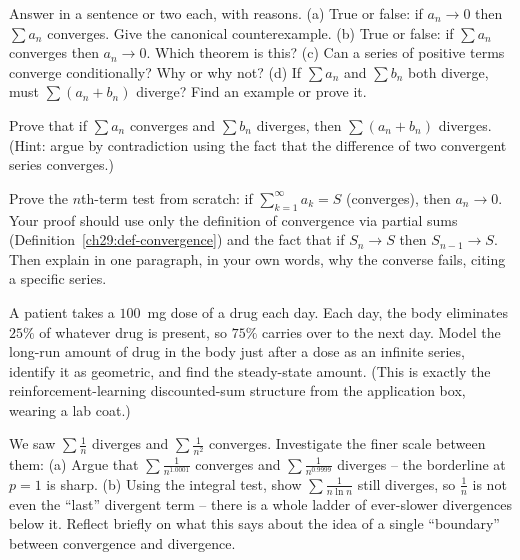 \begin{exercise}[Conceptual]
Answer in a sentence or two each, with reasons.
(a) True or false: if $a_n \to 0$ then $\sum a_n$ converges. Give the canonical counterexample.
(b) True or false: if $\sum a_n$ converges then $a_n \to 0$. Which theorem is this?
(c) Can a series of positive terms converge conditionally? Why or why not?
(d) If $\sum a_n$ and $\sum b_n$ both diverge, must $\sum(a_n+b_n)$ diverge? Find an example or prove it.
\end{exercise}

\begin{exercise}[Prove it]
Prove that if $\sum a_n$ converges and $\sum b_n$ diverges, then $\sum (a_n + b_n)$ diverges. (Hint: argue by contradiction using the fact that the difference of two convergent series converges.)
\end{exercise}

\begin{exercise}
Prove the $n$th-term test from scratch: if $\sum_{k=1}^\infty a_k = S$ (converges), then $a_n \to 0$. Your proof should use only the definition of convergence via partial sums (Definition~\ref{ch29:def-convergence}) and the fact that if $S_n \to S$ then $S_{n-1}\to S$. Then explain in one paragraph, in your own words, why the converse fails, citing a specific series.
\end{exercise}

\begin{exercise}
A patient takes a $100$~mg dose of a drug each day. Each day, the body eliminates $25\%$ of whatever drug is present, so $75\%$ carries over to the next day. Model the long-run amount of drug in the body just after a dose as an infinite series, identify it as geometric, and find the steady-state amount. (This is exactly the reinforcement-learning discounted-sum structure from the application box, wearing a lab coat.)
\end{exercise}

\begin{exercise}
We saw $\sum \tfrac1n$ diverges and $\sum\tfrac1{n^2}$ converges. Investigate the finer scale between them:
(a) Argue that $\sum \tfrac{1}{n^{1.0001}}$ converges and $\sum\tfrac{1}{n^{0.9999}}$ diverges -- the borderline at $p=1$ is sharp.
(b) Using the integral test, show $\sum \tfrac{1}{n\ln n}$ still diverges, so $\tfrac1n$ is not even the ``last'' divergent term -- there is a whole ladder of ever-slower divergences below it. Reflect briefly on what this says about the idea of a single ``boundary'' between convergence and divergence.
\end{exercise}

